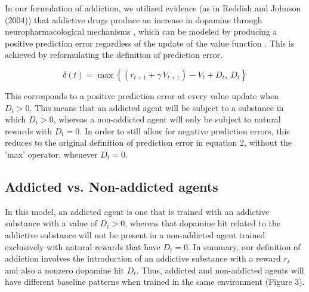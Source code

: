 \documentclass[10pt,letterpaper]{article}
\begin{document}
In our formulation of addiction, we utilized evidence (as in Reddish and Johnson (2004)) that addictive drugs produce an increase in dopamine through neuropharmacological mechanisms \cite{Lowinson2005, Ritz1987}, which can be modeled by producing a positive prediction error regardless of the update of the value function \cite{ReddishJohnson2004, ReddishJensenJohnson2008}. This is achieved by reformulating the definition of prediction error.

\begin{equation}
\delta(t) = \max\left\{(r_{t+1} + \gamma\, V_{t+1}) - V_t + D_t,\ D_t\right\}
\end{equation}

This corresponds to a positive prediction error at every value update when $D_t > 0$. This means that an addicted agent will be subject to a substance in which $D_t > 0$, whereas a non-addicted agent will only be subject to natural rewards with $D_t = 0$. In order to still allow for negative prediction errors, this reduces to the original definition of prediction error in equation 2, without the 'max' operator, whenever $D_t = 0$.


\subsection{Addicted vs. Non-addicted agents}
In this model, an addicted agent is one that is trained with an addictive substance with a value of $D_t > 0$, whereas that dopamine hit related to the addictive substance will not be present in a non-addicted agent trained exclusively with natural rewards that have $D_t=0$. In summary, our definition of addiction involves the introduction of an addictive substance with a reward $r_t$ and also a nonzero dopamine hit $D_t$. Thus, addicted and non-addicted agents will have different baseline patterns when trained in the same environment (Figure 3).
\end{document}
